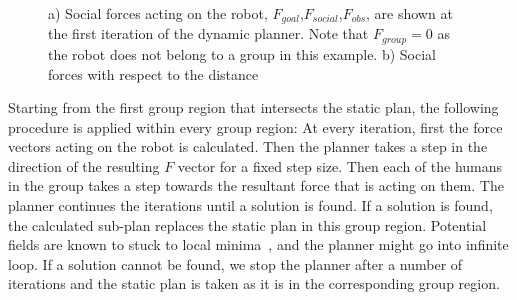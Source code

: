 \begin{figure}[ht!]
\centering
%
    \caption{%
	a) Social forces acting on the robot, $F_{goal}$,$F_{social}$,$F_{obs}$, are shown at the first iteration of the dynamic planner. Note that $F_{group}=0$ as the robot does not belong to a group in this example. b) Social forces with respect to the distance
     }%
   \label{fig:forces}
\end{figure}

Starting from the first group region that intersects the static plan, the following procedure is applied within every group region: At every iteration, first the force vectors acting on the robot is calculated. Then the planner takes a step in the direction of the resulting $F$ vector for a fixed step size. Then each of the humans in the group takes a step towards the resultant force that is acting on them. The planner continues the iterations until a solution is found. If a solution is found, the calculated sub-plan replaces the static plan in this group region. Potential fields are known to stuck to local minima~\cite{koren1991potential}, and the planner might go into infinite loop. If a solution cannot be found, we stop the planner after a number of iterations and the static plan is taken as it is in the corresponding group region.


